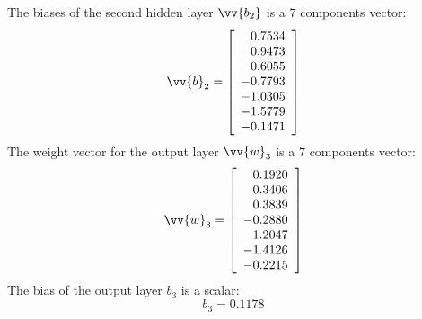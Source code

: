 \documentclass[twoside,english,1p,final,sort&compress]{elsarticle}
\theoremstyle{plain}
\renewcommand{\overrightarrow}{\vv}
\begin{document}
The biases of the second hidden layer $\overrightarrow{b_2}$ is a $7$ components vector:
\begin{equation*}
\overrightarrow{b}_2 = \left[
\begin{array}{r}
0.7534\\ 
0.9473\\ 
0.6055\\ 
-0.7793\\ 
-1.0305\\ 
-1.5779\\ 
-0.1471\\ 
\end{array}\right]
\end{equation*}
The weight vector for the output layer $\overrightarrow{w}_3$ is a $7$ components vector:
\begin{equation*}
\overrightarrow{w}_3 = \left[
\begin{array}{r}
0.1920\\ 
0.3406\\ 
0.3839\\ 
-0.2880\\ 
1.2047\\ 
-1.4126\\ 
-0.2215\\ 
\end{array}\right]
\end{equation*}
The bias of the output layer $b_3$ is a scalar:
\begin{equation*}
b_3 = 0.1178 
\end{equation*}
\end{document}
